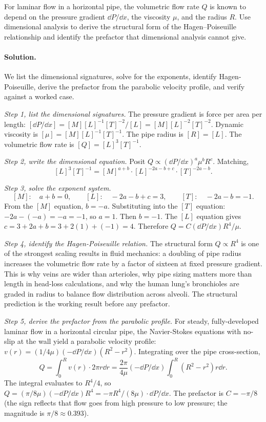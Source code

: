 \begin{exercise}
For laminar flow in a horizontal pipe, the volumetric flow rate $Q$
is known to depend on the pressure gradient $\dd P / \dd x$, the
viscosity $\mu$, and the radius $R$. Use dimensional analysis to
derive the structural form of the Hagen--Poiseuille relationship and
identify the prefactor that dimensional analysis cannot give.

\paragraph{Solution.}
We list the dimensional signatures, solve for the exponents,
identify Hagen-Poiseuille, derive the prefactor from the parabolic
velocity profile, and verify against a worked case.

\textit{Step 1, list the dimensional signatures.} The pressure
gradient is force per area per length:
$[\dd P/\dd x] = [M][L]^{-1}[T]^{-2} / [L] = [M][L]^{-2}[T]^{-2}$.
Dynamic viscosity is $[\mu] = [M][L]^{-1}[T]^{-1}$. The pipe radius
is $[R] = [L]$. The volumetric flow rate is
$[Q] = [L]^{3}[T]^{-1}$.

\textit{Step 2, write the dimensional equation.} Posit
$Q \propto (\dd P/\dd x)^{a} \mu^{b} R^{c}$. Matching,
\[
[L]^{3}[T]^{-1}
= [M]^{a+b} \cdot [L]^{-2a - b + c} \cdot [T]^{-2a - b}.
\]

\textit{Step 3, solve the exponent system.}
\[
[M]: \quad a + b = 0, \qquad
[L]: \quad -2a - b + c = 3, \qquad
[T]: \quad -2a - b = -1.
\]
From the $[M]$ equation, $b = -a$. Substituting into the $[T]$
equation: $-2a - (-a) = -a = -1$, so $a = 1$. Then $b = -1$. The
$[L]$ equation gives $c = 3 + 2a + b = 3 + 2(1) + (-1) = 4$.
Therefore $Q = C (\dd P/\dd x) R^{4} / \mu$.

\textit{Step 4, identify the Hagen-Poiseuille relation.} The
structural form $Q \propto R^{4}$ is one of the strongest scaling
results in fluid mechanics: a doubling of pipe radius increases the
volumetric flow rate by a factor of sixteen at fixed pressure
gradient. This is why veins are wider than arterioles, why pipe
sizing matters more than length in head-loss calculations, and why
the human lung's bronchioles are graded in radius to balance flow
distribution across alveoli. The structural prediction is the
working result before any prefactor.

\textit{Step 5, derive the prefactor from the parabolic profile.}
For steady, fully-developed laminar flow in a horizontal circular
pipe, the Navier-Stokes equations with no-slip at the wall yield a
parabolic velocity profile: $v(r) = (1/4\mu) (-\dd P/\dd x)(R^{2} -
r^{2})$. Integrating over the pipe cross-section,
\[
Q = \int_{0}^{R} v(r) \cdot 2\pi r \dd r
= \frac{2\pi}{4\mu}(-\dd P/\dd x) \int_{0}^{R} (R^{2} - r^{2}) r \dd r.
\]
The integral evaluates to $R^{4}/4$, so
$Q = (\pi/8\mu)(-\dd P/\dd x) R^{4} =
-\pi R^{4}/(8\mu) \cdot \dd P/\dd x$. The prefactor is
$C = -\pi/8$ (the sign reflects that flow goes from high pressure
to low pressure; the magnitude is $\pi/8 \approx 0.393$).


\end{exercise}
